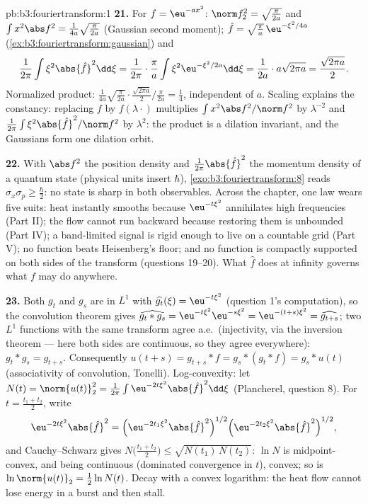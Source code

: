 \begin{solution}{pb:b3:fouriertransform:1}
\textbf{21.} For $f = \eu^{-ax^2}$: $\norm f_2^2 =
\sqrt{\frac\pi{2a}}$ and $\int x^2\abs f^2 =
\frac1{4a}\sqrt{\frac{\pi}{2a}}$ (Gaussian second moment);
$\hat f = \sqrt{\frac\pi a}\,\eu^{-\xi^2/4a}$
(\cref{ex:b3:fouriertransform:gaussian}) and
\[
\frac1{2\pi}\int\xi^2\abs{\hat f}^2\dd\xi =
\frac1{2\pi}\cdot\frac\pi a\int\xi^2
\eu^{-\xi^2/2a}\dd\xi = \frac1{2a}\cdot a\sqrt{2\pi a}
= \frac{\sqrt{2\pi a}}2 .
\]
Normalized product: $\frac1{4a}\sqrt{\frac\pi{2a}}\cdot
\frac{\sqrt{2\pi a}}2\big/\frac{\pi}{2a} = \frac14$,
independent of $a$. Scaling explains the constancy: replacing
$f$ by $f(\lambda\cdot)$ multiplies $\int x^2\abs f^2/\norm
f^2$ by $\lambda^{-2}$ and $\frac1{2\pi}\int\xi^2\abs{\hat
f}^2/\norm f^2$ by $\lambda^{2}$: the product is a dilation
invariant, and the Gaussians form one dilation orbit.

\textbf{22.} With $\abs f^2$ the position density and
$\frac1{2\pi}\abs{\hat f}^2$ the momentum density of a
quantum state (physical units insert $\hbar$),
\cref{exo:b3:fouriertransform:8} reads $\sigma_x\sigma_p
\geq \frac\hbar2$: no state is sharp in both observables.
Across the chapter, one law wears five suits: heat instantly
smooths because $\eu^{-t\xi^2}$ annihilates high frequencies
(Part II); the flow cannot run backward because restoring
them is unbounded (Part IV); a band-limited signal is rigid
enough to live on a countable grid (Part V); no function
beats Heisenberg's floor; and no function is compactly
supported on both sides of the transform (questions 19--20).
What $\hat f$ does at infinity governs what $f$ may do
anywhere.

\textbf{23.} Both $g_t$ and $g_s$ are in $L^1$ with
$\widehat{g_t}(\xi) = \eu^{-t\xi^2}$ (question 1's
computation), so the convolution theorem gives
$\widehat{g_t * g_s} = \eu^{-t\xi^2}\eu^{-s\xi^2} =
\eu^{-(t+s)\xi^2} = \widehat{g_{t+s}}$; two $L^1$ functions
with the same transform agree a.e.\ (injectivity, via the
inversion theorem --- here both sides are continuous, so
they agree everywhere): $g_t * g_s = g_{t+s}$. Consequently
$u(t + s) = g_{t+s} * f = g_s * (g_t * f) = g_s * u(t)$
(associativity of convolution, Tonelli). Log-convexity: let
$N(t) = \norm{u(t)}_2^2 = \frac1{2\pi}\int
\eu^{-2t\xi^2}\abs{\hat f}^2\dd\xi$ (Plancherel, question
8). For $t = \frac{t_1 + t_2}2$, write
\[
\eu^{-2t\xi^2}\abs{\hat f}^2
= \Bigl(\eu^{-2t_1\xi^2}\abs{\hat f}^2\Bigr)^{1/2}
\Bigl(\eu^{-2t_2\xi^2}\abs{\hat f}^2\Bigr)^{1/2},
\]
and Cauchy--Schwarz gives $N\bigl(\frac{t_1+t_2}2\bigr) \leq
\sqrt{N(t_1)\,N(t_2)}$: $\ln N$ is midpoint-convex, and
being continuous (dominated convergence in $t$), convex; so
is $\ln\norm{u(t)}_2 = \frac12\ln N(t)$. Decay with a convex
logarithm: the heat flow cannot lose energy in a burst and
then stall.


\end{solution}
